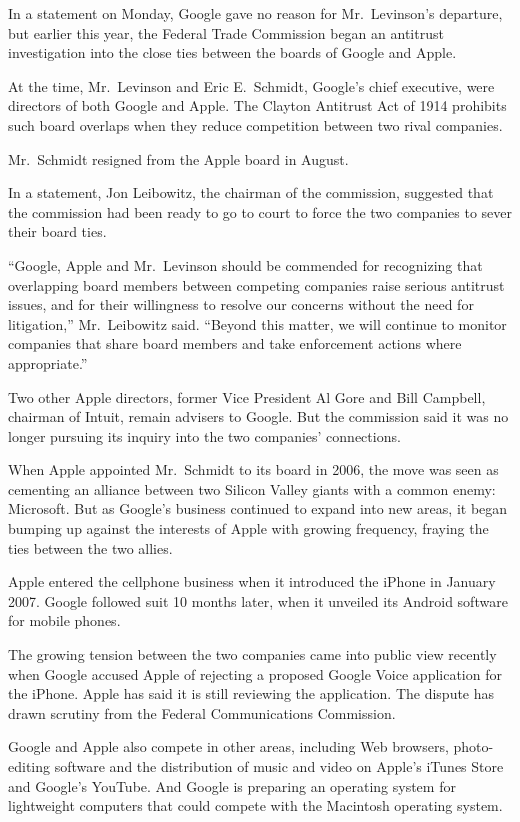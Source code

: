 ﻿\documentclass[12pt]{article}
\begin{document}
In a statement on Monday, Google gave no reason for Mr.~Levinson's departure, but earlier this year,
the Federal Trade Commission began an antitrust investigation into the close ties between the boards
of Google and Apple.

At the time, Mr.~Levinson and Eric E.~Schmidt, Google's chief executive, were directors of both
Google and Apple. The Clayton Antitrust Act of 1914 prohibits such board overlaps when they reduce
competition between two rival companies.

Mr.~Schmidt resigned from the Apple board in August.

In a statement, Jon Leibowitz, the chairman of the commission, suggested that the commission had
been ready to go to court to force the two companies to sever their board ties.

``Google, Apple and Mr.~Levinson should be commended for recognizing that overlapping board members
between competing companies raise serious antitrust issues, and for their willingness to resolve our
concerns without the need for litigation,'' Mr.~Leibowitz said. ``Beyond this matter, we will
continue to monitor companies that share board members and take enforcement actions where
appropriate.''

Two other Apple directors, former Vice President Al Gore and Bill Campbell, chairman of Intuit,
remain advisers to Google. But the commission said it was no longer pursuing its inquiry into the
two companies' connections.

When Apple appointed Mr.~Schmidt to its board in 2006, the move was seen as cementing an alliance
between two Silicon Valley giants with a common enemy: Microsoft. But as Google's business continued
to expand into new areas, it began bumping up against the interests of Apple with growing frequency,
fraying the ties between the two allies.

Apple entered the cellphone business when it introduced the iPhone in January 2007. Google followed
suit 10 months later, when it unveiled its Android software for mobile phones.

The growing tension between the two companies came into public view recently when Google accused
Apple of rejecting a proposed Google Voice application for the iPhone. Apple has said it is still
reviewing the application. The dispute has drawn scrutiny from the Federal Communications
Commission.

Google and Apple also compete in other areas, including Web browsers, photo-editing software and the
distribution of music and video on Apple's iTunes Store and Google's YouTube. And Google is
preparing an operating system for lightweight computers that could compete with the Macintosh
operating system.
\end{document}
